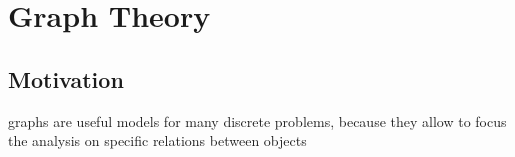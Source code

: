\clearpage
\section{Graph Theory}
\subsection{Motivation}
graphs are useful models for many discrete problems, because they allow to focus the analysis on specific relations between objects





